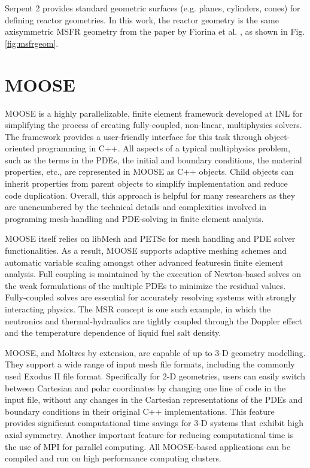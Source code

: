 Serpent 2 provides standard geometric surfaces (e.g. planes, cylinders, cones)
for defining reactor geometries. In this work, the reactor geometry is the
same axisymmetric \gls{MSFR} geometry from the paper by Fiorina et al.
\cite{fiorina_modelling_2014}, as shown in Fig. \ref{fig:msfrgeom}.

\section{MOOSE}

\gls{MOOSE} \cite{gaston_physics-based_2015} is a highly parallelizable,
finite element framework developed at \gls{INL} for simplifying the process of
creating fully-coupled, non-linear, multiphysics solvers. The framework
provides a user-friendly interface for this task through object-oriented
programming in C++. All aspects of a typical multiphysics problem, such as the
terms in the \glspl{PDE}, the initial and boundary conditions, the material
properties, etc., are represented in \gls{MOOSE} as C++ objects. Child objects
can inherit properties from parent objects to simplify implementation and
reduce code duplication. Overall, this approach
is helpful for many researchers as they are unencumbered by the
technical details and complexities involved in programing mesh-handling
and \gls{PDE}-solving in finite element analysis.

\gls{MOOSE} itself relies on libMesh \cite{kirk_libmesh:_2006} and
PETSc \cite{satish_petsc_2019} for mesh handling and \gls{PDE} solver
functionalities. As a result, \gls{MOOSE} supports adaptive meshing schemes
and automatic variable scaling amongst other advanced featuresin finite
element analysis. Full
coupling is maintained by the execution of Newton-based solves on the
weak formulations of the multiple \glspl{PDE} to minimize the residual values.
Fully-coupled solves are essential for accurately resolving systems with
strongly interacting physics. The \gls{MSR} concept is one such example, in
which the neutronics and thermal-hydraulics are tightly coupled through the
Doppler effect and the temperature dependence of liquid fuel salt density.

\gls{MOOSE}, and Moltres by extension, are capable of up to 3-D geometry
modelling. They support a wide range of input mesh file formats, including the
commonly used Exodus II file format. Specifically for 2-D geometries, users
can easily switch between Cartesian and polar coordinates by changing one line
of code in the input file, without any changes in
the Cartesian representations of the \glspl{PDE} and boundary conditions in
their original C++ implementations. This feature provides significant
computational time savings for 3-D systems that exhibit high axial symmetry.
Another important feature for reducing computational time is the use of MPI
for parallel computing. All \gls{MOOSE}-based applications can be compiled and
run on high performance computing clusters.

